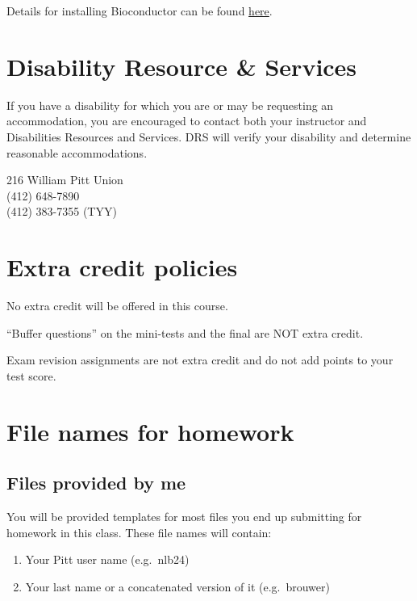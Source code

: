 \documentclass[
]{book}
\providecommand{\tightlist}{%
  \setlength{\itemsep}{0pt}\setlength{\parskip}{0pt}}
\begin{document}
Details for installing Bioconductor can be found \href{https://brouwern.github.io/lbrb/installing-bioconductor.html}{here}.

\hypertarget{DRS}{%
\chapter{Disability Resource \& Services}\label{DRS}}

If you have a disability for which you are or may be requesting an accommodation, you are encouraged to contact both your instructor and Disabilities Resources and Services. DRS will verify your disability and determine reasonable accommodations.

216 William Pitt Union\\
(412) 648-7890\\
(412) 383-7355 (TYY)

\hypertarget{extracredit}{%
\chapter{Extra credit policies}\label{extracredit}}

No extra credit will be offered in this course.

``Buffer questions'' on the mini-tests and the final are NOT extra credit.

Exam revision assignments are not extra credit and do not add points to your test score.

\hypertarget{file_names}{%
\chapter{File names for homework}\label{file_names}}

\hypertarget{files-provided-by-me}{%
\section{Files provided by me}\label{files-provided-by-me}}

You will be provided templates for most files you end up submitting for homework in this class. These file names will contain:

\begin{enumerate}
\def\labelenumi{\arabic{enumi}.}
\tightlist
\item
  Your Pitt user name (e.g.~nlb24)
\item
  Your last name or a concatenated version of it (e.g.~brouwer)
\end{enumerate}
\end{document}
